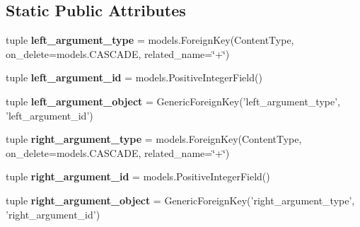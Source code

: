 \subsection*{Static Public Attributes}
\begin{DoxyCompactItemize}
\item 
\hypertarget{classscheduler_1_1models_1_1_user_preference_or_constraint_a0455877d277a31c0561935c7074b664b}{tuple {\bfseries left\-\_\-argument\-\_\-type} = models.\-Foreign\-Key(Content\-Type, on\-\_\-delete=models.\-C\-A\-S\-C\-A\-D\-E, related\-\_\-name=\char`\"{}+\char`\"{})}\label{classscheduler_1_1models_1_1_user_preference_or_constraint_a0455877d277a31c0561935c7074b664b}

\item 
\hypertarget{classscheduler_1_1models_1_1_user_preference_or_constraint_aa1b1f271f6f1f18d5e99996db4840337}{tuple {\bfseries left\-\_\-argument\-\_\-id} = models.\-Positive\-Integer\-Field()}\label{classscheduler_1_1models_1_1_user_preference_or_constraint_aa1b1f271f6f1f18d5e99996db4840337}

\item 
\hypertarget{classscheduler_1_1models_1_1_user_preference_or_constraint_a1880c90f057ecd54a9a484faa30e3df5}{tuple {\bfseries left\-\_\-argument\-\_\-object} = Generic\-Foreign\-Key('left\-\_\-argument\-\_\-type', 'left\-\_\-argument\-\_\-id')}\label{classscheduler_1_1models_1_1_user_preference_or_constraint_a1880c90f057ecd54a9a484faa30e3df5}

\item 
\hypertarget{classscheduler_1_1models_1_1_user_preference_or_constraint_a30dcc18f79528b7860691bced63d3426}{tuple {\bfseries right\-\_\-argument\-\_\-type} = models.\-Foreign\-Key(Content\-Type, on\-\_\-delete=models.\-C\-A\-S\-C\-A\-D\-E, related\-\_\-name=\char`\"{}+\char`\"{})}\label{classscheduler_1_1models_1_1_user_preference_or_constraint_a30dcc18f79528b7860691bced63d3426}

\item 
\hypertarget{classscheduler_1_1models_1_1_user_preference_or_constraint_adbb69d170fd984fe2ec36e340cdf3533}{tuple {\bfseries right\-\_\-argument\-\_\-id} = models.\-Positive\-Integer\-Field()}\label{classscheduler_1_1models_1_1_user_preference_or_constraint_adbb69d170fd984fe2ec36e340cdf3533}

\item 
\hypertarget{classscheduler_1_1models_1_1_user_preference_or_constraint_a3a80b4294939af457c24a9377bc43239}{tuple {\bfseries right\-\_\-argument\-\_\-object} = Generic\-Foreign\-Key('right\-\_\-argument\-\_\-type', 'right\-\_\-argument\-\_\-id')}\label{classscheduler_1_1models_1_1_user_preference_or_constraint_a3a80b4294939af457c24a9377bc43239}

\end{DoxyCompactItemize}



